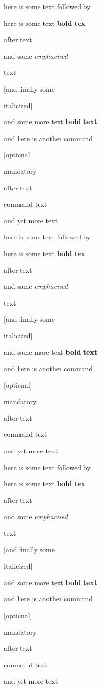 here is some text followed by \mycommand

{here is some text \textbf

	{bold tex}

	after text}

{and some \emph

	{emphacised}

	text}

[and finally some \itshape

	{italicized}]

and
some more text \textbf

{bold text}

and here is another command \cmh

[optional]

{mandatory}

after text \final

{command text}

and yet more text

here is some text followed by \mycommand

{here is some text \textbf

	{bold tex}

	after text}

{and some \emph

	{emphacised}

	text}

[and finally some \itshape

	{italicized}]

and
some more text \textbf

{bold text}

and here is another command \cmh

[optional]

{mandatory}

after text \final

{command text}

and yet more text

here is some text followed by \mycommand

{here is some text \textbf

	{bold tex}

	after text}

{and some \emph

	{emphacised}

	text}

[and finally some \itshape

	{italicized}]

and
some more text \textbf

{bold text}

and here is another command \cmh

[optional]

{mandatory}

after text \final

{command text}

and yet more text
